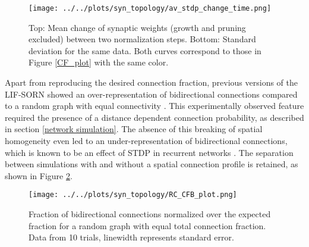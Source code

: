 \documentclass[10pt,a4paper]{article}
\begin{document}
\begin{figure}
\texttt{[image: ../../plots/syn\_topology/av\_stdp\_change\_time.png]}
\caption{Top: Mean change of synaptic weights (growth and pruning excluded) between two normalization steps. Bottom: Standard deviation for the same data. Both curves correspond to those in Figure \ref{CF_plot} with the same color.}
\label{STDP_change}
\end{figure}
Apart from reproducing the desired connection fraction, previous versions of the LIF-SORN showed an over-representation of bidirectional connections compared to a random graph with equal connectivity \cite{SORN_Paper}. This experimentally observed feature required the presence of a distance dependent connection probability, as described in section \ref{network simulation}. The absence of this breaking of spatial homogeneity even led to an under-representation of bidirectional connections, which is known to be an effect of STDP in recurrent networks \cite{Syn_Plast_Abbott}. The separation between simulations with and without a spatial connection profile is retained, as shown in Figure \ref{RC_CFB_plot}. 
\begin{figure}
\texttt{[image: ../../plots/syn\_topology/RC\_CFB\_plot.png]}
\caption{Fraction of bidirectional connections normalized over the expected fraction for a random graph with equal total connection fraction. Data from 10 trials, linewidth represents standard error.}
\label{RC_CFB_plot}
\end{figure}
\end{document}
